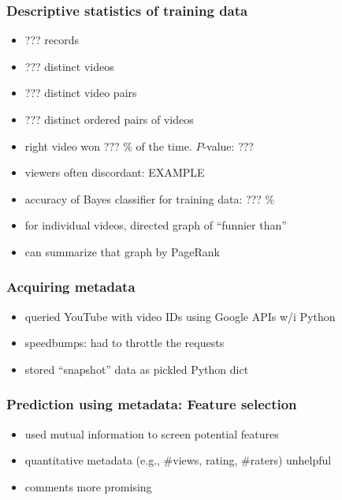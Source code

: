 \documentclass[fleqn]{beamer}
\begin{document}
\begin{frame}
\frametitle{Descriptive statistics of training data}
      \begin{itemize}
         \item ??? records
         \item ??? distinct videos
         \item ??? distinct video pairs
         \item ??? distinct ordered pairs of videos
         \item right video won ??? \% of the time. $P$-value: ???
         \item viewers often discordant: EXAMPLE
         \item accuracy of Bayes classifier for training data: ??? \%
         \item for individual videos, directed graph of ``funnier than''
         \item can summarize that graph by PageRank
     \end{itemize}

\end{frame}

\begin{frame}
\frametitle{Acquiring metadata}
   \begin{itemize}
       \item queried YouTube with video IDs using Google APIs w/i Python
       \item speedbumps: had to throttle the requests
       \item stored ``snapshot'' data as pickled Python dict
   \end{itemize}
\end{frame}

\begin{frame}
\frametitle{Prediction using metadata: Feature selection}
      \begin{itemize}
          \item used mutual information to screen potential features
          \item quantitative metadata (e.g., \#views, rating, \#raters) unhelpful
          \item comments more promising
      \end{itemize}

\end{frame}
\end{document}
